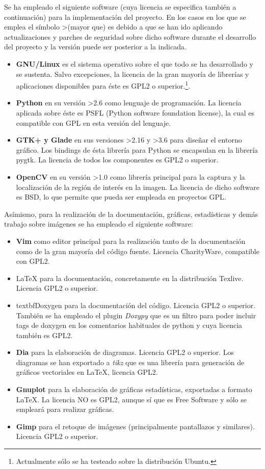 Se ha empleado el siguiente software (cuya licencia se especifica también a continuación) para la implementación del proyecto. En los casos en los que se emplea el símbolo \textgreater (mayor que) es debido a que se han ido aplicando actualizaciones y parches de seguridad sobre dicho software durante el desarrollo del proyecto y la versión puede ser posterior a la indicada.
\begin{itemize}
	\item{\textbf{GNU/Linux} es el sistema operativo sobre el que todo se ha desarrollado y se sustenta. Salvo excepciones, la licencia de la gran mayoría de librerías y aplicaciones disponibles para éste es GPL2 o superior.\footnote{Actualmente sólo se ha testeado sobre la distribución Ubuntu.}.}
	\item{\textbf{Python} en su versión \textgreater2.6 como lenguaje de programación. La licencia aplicada sobre éste es PSFL (Python software foundation license), la cual es compatible con GPL en esta versión del lenguaje.}
	\item{\textbf{GTK+ y Glade} en sus versiones \textgreater2.16 y \textgreater3.6 para diseñar el entorno gráfico. Los bindings de ésta librería para Python se encapsulan en la librería pygtk. La licencia de todos los componentes es GPL2 o superior.}
	\item{\textbf{OpenCV} en su versión \textgreater1.0 como librería principal para la captura y la localización de la región de interés en la imagen. La licencia de dicho software es BSD, lo que permite que pueda ser empleada en proyectos GPL.}
\end{itemize}
Asímismo, para la realización de la documentación, gráficas, estadísticas y demás trabajo sobre imágenes se ha empleado el siguiente software:
\begin{itemize}
	\item{\textbf{Vim} como editor principal para la realización tanto de la documentación como de la gran mayoría del código fuente. Licencia CharityWare, compatible con GPL2.}
	\item{\LaTeX{} para la documentación, concretamente en la distribución Texlive. Licencia GPL2 o superior.}
	\item{textbf{Doxygen} para la documentación del código. Licencia GPL2 o superior. También se ha empleado el plugin \textit{Doxypy} que es un filtro para poder incluir tags de doxygen en los comentarios habituales de python y cuya licencia también es GPL2.}
	\item{\textbf{Dia} para la elaboración de diagramas. Licencia GPL2 o superior. Los diagramas se han exportado a \textit{tikz} que es una librería para generación de gráficos vectoriales en \LaTeX{}, licencia GPL2. }
	\item{\textbf{Gnuplot} para la elaboración de gráficas estadísticas, exportadas a formato \LaTeX{}. La licencia NO es GPL2, aunque sí que es Free Software y sólo se empleará para realizar gráficas.}
	\item{\textbf{Gimp} para el retoque de imágenes (principalmente pantallazos y similares). Licencia GPL2 o superior.}
\end{itemize}

